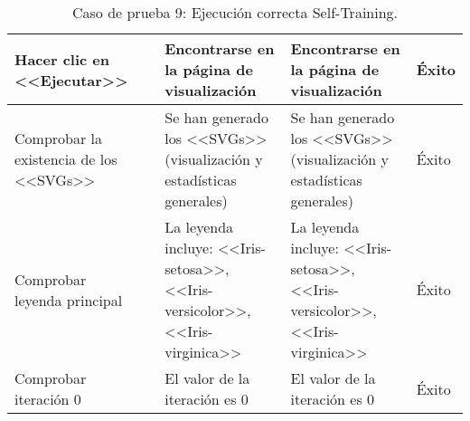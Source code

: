 \begin{table}[H]
\begin{tabular}{p{}p{}p{}p{}p{}}
Hacer clic en <<Ejecutar>>                            &                        & Encontrarse en la página de visualización                            & Encontrarse en la página de visualización                    & Éxito                            \\ \hline
Comprobar la existencia de los <<SVGs>>               &                        & Se han generado los <<SVGs>> (visualización y estadísticas generales) & Se han generado los <<SVGs>> (visualización y estadísticas generales)& Éxito  \\ \hline 
Comprobar leyenda principal                           &                        & La leyenda incluye: <<Iris-setosa>>, <<Iris-versicolor>>, <<Iris-virginica>> & La leyenda incluye: <<Iris-setosa>>, <<Iris-versicolor>>, <<Iris-virginica>> & Éxito \\ \hline
Comprobar iteración 0                                 &                        & El valor de la iteración es 0                                        & El valor de la iteración es 0                                & Éxito \\ \hline
\end{tabular}
\caption{Caso de prueba 9: Ejecución correcta Self-Training.}
\end{table}


